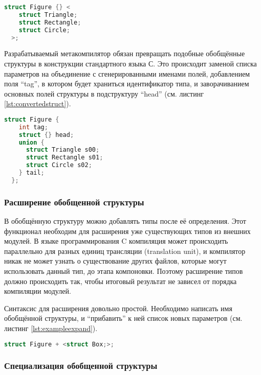 \begin{lstlisting}[language=c, caption={Пример обобщённой структуры}, label={lst:examplestruct}]
  struct Figure {} <
    struct Triangle;
    struct Rectangle;
    struct Circle;
  >;
\end{lstlisting}

Разрабатываемый метакомпилятор обязан превращать подобные обобщённые структуры в конструкции стандартного языка С.
Это происходит заменой списка параметров на объединение с сгенерированными именами полей, добавлением поля ``tag'', в котором будет храниться идентификатор типа, и заворачиванием основных полей структуры в подструктуру ``head'' (см. листинг \ref{lst:convertedstruct}).

\begin{lstlisting}[language=c, caption={Пример обобщённой структуры, сконвертированный в С}, label={lst:convertedstruct}]
  struct Figure {
    int tag;
    struct {} head;
    union {
      struct Triangle s00;
      struct Rectangle s01;
      struct Circle s02;
    } tail;
  };
\end{lstlisting}

\subsubsection{Расширение обобщенной структуры}

В обобщённую структуру можно добавлять типы после её определения.
Этот функционал необходим для расширения уже существующих типов из внешних модулей.
В языке программирования C компиляция может происходить параллельно для разных единиц трансляции (translation unit), и компилятор никак не может узнать о существование других файлов, которые могут использовать данный тип, до этапа компоновки.
Поэтому расширение типов должно происходить так, чтобы итоговый результат не зависел от порядка компиляции модулей.

Синтаксис для расширения довольно простой. Необходимо написать имя обобщённой структуры, и ``прибавить'' к ней список новых параметров (см. листинг \ref{lst:exampleexpand}).

\begin{lstlisting}[language=c, caption={Пример расширения обобщенной структуры}, label={lst:exampleexpand}]
  struct Figure + <struct Box;>;
\end{lstlisting}

\subsubsection{Специализация обобщенной структуры}

